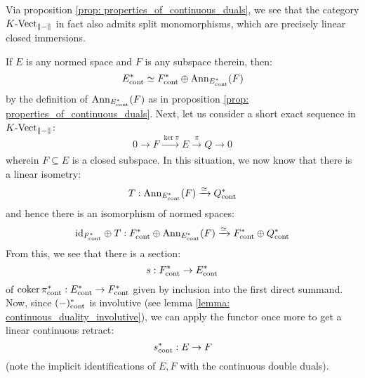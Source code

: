         \begin{remark}
            Via proposition \ref{prop: properties_of_continuous_duals}, we see that the category $K\text{-}\mathrm{Vect}_{\left\| {-} \right\|}$ in fact also admits split monomorphisms, which are precisely linear closed immersions.

            If $E$ is any normed space and $F$ is any subspace therein, then:
                $$E^*_{\mathrm{cont}} \simeq F^*_{\mathrm{cont}} \oplus \mathrm{Ann}_{E^*_{\mathrm{cont}}}(F)$$
            by the definition of $\mathrm{Ann}_{E^*_{\mathrm{cont}}}(F)$ as in proposition \ref{prop: properties_of_continuous_duals}. Next, let us consider a short exact sequence in $K\text{-}\mathrm{Vect}_{\left\| {-} \right\|}$:
                $$0 \to F \xrightarrow[]{\ker \pi} E \xrightarrow[]{\pi} Q \to 0$$
            wherein $F \subseteq E$ is a closed subspace. In this situation, we now know that there is a linear isometry:
                $$T: \mathrm{Ann}_{E^*_{\mathrm{cont}}}(F) \xrightarrow[]{\simeq} Q^*_{\mathrm{cont}}$$
            and hence there is an isomorphism of normed spaces:
                $$\mathrm{id}_{F^*_{\mathrm{cont}}} \oplus T: F^*_{\mathrm{cont}} \oplus \mathrm{Ann}_{E^*_{\mathrm{cont}}}(F) \xrightarrow[]{\simeq} F^*_{\mathrm{cont}} \oplus Q^*_{\mathrm{cont}}$$
            From this, we see that there is a section:
                $$s: F^*_{\mathrm{cont}} \to E^*_{\mathrm{cont}}$$
            of $\operatorname{coker} \pi^*_{\mathrm{cont}}: E^*_{\mathrm{cont}} \to F^*_{\mathrm{cont}}$ given by inclusion into the first direct summand. Now, since $(-)^*_{\mathrm{cont}}$ is involutive (see lemma \ref{lemma: continuous_duality_involutive}), we can apply the functor once more to get a linear continuous retract:
                $$s^*_{\mathrm{cont}}: E \to F$$
            (note the implicit identifications of $E, F$ with the continuous double duals).
        \end{remark}

